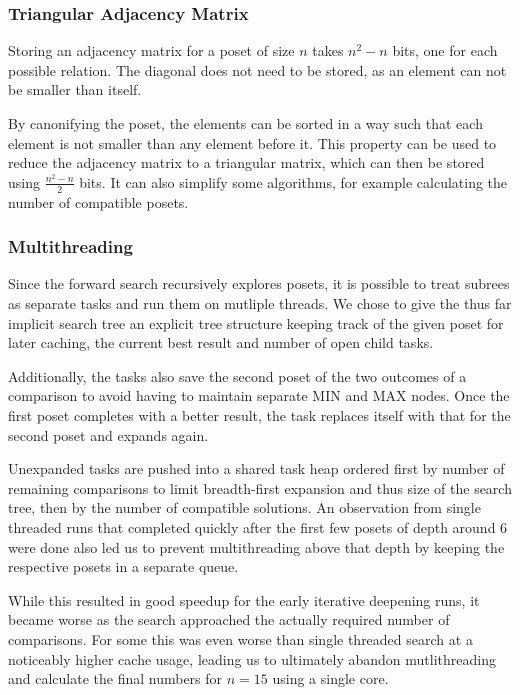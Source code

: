 \documentclass[10pt,journal,compsoc]{IEEEtran}
\begin{document}
\subsubsection{Triangular Adjacency Matrix}
Storing an adjacency matrix for a poset of size $n$ takes $n^2 - n$ bits, one for each possible relation.
The diagonal does not need to be stored, as an element can not be smaller than itself.

By canonifying the poset, the elements can be sorted in a way such that each element is not smaller than any element before it.
This property can be used to reduce the adjacency matrix to a triangular matrix, which can then be stored using $\frac{n^2 - n}{2}$ bits.
It can also simplify some algorithms, for example calculating the number of compatible posets.

\subsubsection{Multithreading}

Since the forward search recursively explores posets, it is possible to
treat subrees as separate tasks and run them on mutliple threads.
We chose to give the thus far implicit search tree an explicit
tree structure keeping track of the given poset for later caching,
the current best result and number of open child tasks.

Additionally, the tasks also save the second poset of the two
outcomes of a comparison to avoid having to maintain separate
MIN and MAX nodes. Once the first poset completes with a better result,
the task replaces itself with that for the second poset and expands
again.

Unexpanded tasks are pushed into a shared task heap ordered first by
number of remaining comparisons to limit breadth-first expansion and
thus size of the search tree, then by the number of compatible solutions.
An observation from single threaded runs that completed quickly after
the first few posets of depth around $6$ were done also led us to
prevent multithreading above that depth by keeping the respective posets
in a separate queue.

While this resulted in good speedup for the early iterative deepening
runs, it became worse as the search approached the actually required
number of comparisons. For some this was even worse than single
threaded search at a noticeably higher cache usage, leading us to
ultimately abandon mutlithreading and calculate the final numbers
for $n=15$ using a single core.
\end{document}

